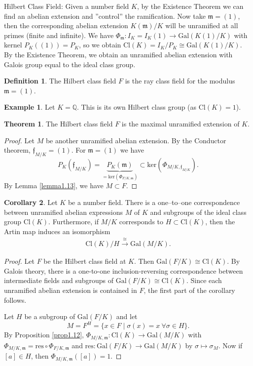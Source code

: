 \documentclass{article}
\theoremstyle{definition}
\newtheorem{theorem}{Theorem}[section]
\newtheorem{cor}[theorem]{Corollary}
\newtheorem{example}{Example}[section]
\newtheorem{defn}{Definition}[section]
\begin{document}
Hilbert Class Field: Given a number field $K$, by the Existence Theorem we can find an abelian extension and ''control'' the ramification. Now take $\mathfrak{m} = (1)$, then the corresponding abelian extension $K(\mathfrak{m})/K$ will be unramified at all primes (finite and infinite). We have $\Phi_{\mathfrak{m}}: I_K = I_K(1) \to \text{Gal}(K(1)/K)$ with kernel $P_K((1)) = P_K$, so we obtain $\text{Cl}(K) = I_K/P_K \cong \text{Gal}(K(1)/K)$. By the Existence Theorem, we obtain an unramified abelian extension with Galois group equal to the ideal class group. 
\begin{defn}
    The Hilbert class field $F$ is the ray class field for the modulus $\mathfrak{m}=(1)$.
\end{defn}
\begin{example}
    Let $K=\mathbb{Q}$. This is its own Hilbert class group (as $\text{Cl}(K)=1$).
\end{example}
\begin{theorem}
    The Hilbert class field $F$ is the maximal unramified extension of $K$.
\end{theorem}
\begin{proof}
    Let $M$ be another unramified abelian extension. By the Conductor theorem, $\mathfrak{f}_{M/K} = (1)$. For $\mathfrak{m} = (1)$ we have $$P_K(\mathfrak{f}_{M/K}) = \underbrace{P_K(\mathfrak{m})}_{=\text{ker}(\Phi_{F/K,\mathfrak{m}})} \subset \text{ker}(\Phi_{M/K,\mathfrak{f}_{M/K}}).$$ By Lemma \ref{lemma1.13}, we have $M \subset F$.
\end{proof}
\begin{cor}
    Let $K$ be a number field. There is a one--to--one correspondence between unramified abelian expressions $M$ of $K$ and subgroups of the ideal class group $\text{Cl}(K)$. Furthermore, if $M/K$ corresponds to $H \subset \text{Cl}(K)$, then the Artin map induces an isomorphism 
    \begin{align*}
        \text{Cl}(K)/H \stackrel{\cong}{\to} \text{Gal}(M/K).
    \end{align*}
\end{cor}
\begin{proof}
    Let $F$ be the Hilbert class field at $K$. Then $\text{Gal}(F/K) \cong \text{Cl}(K)$. By Galois theory, there is a one-to-one inclusion-reversing correspondence between intermediate fields and subgroups of $\text{Gal}(F/K) \cong \text{Cl}(K)$. Since each unramified abelian extension is contained in $F$, the first part of the corollary follows.
    \vspace{1mm}
     
    Let $H$ be a subgroup of $\text{Gal}(F/K)$ and let \[
    M = F^H = \{x \in F \mid \sigma(x)=x ~\forall \sigma \in H\}.
    \]
    By Proposition \ref{prop1.12}, $\Phi_{M/K,\mathfrak{m}} : \text{Cl}(K) \to \text{Gal}(M/K)$ with $\Phi_{M/K,\mathfrak{m}} = \text{res} \circ \Phi_{F/K,\mathfrak{m}}$ and $\text{res}:\text{Gal}(F/K) \to \text{Gal}(M/K)$ by $\sigma \mapsto \sigma_M$. Now if $[a] \in H$, then $\Phi_{M/K,\mathfrak{m}}([a])=1$.
\end{proof}
\end{document}
